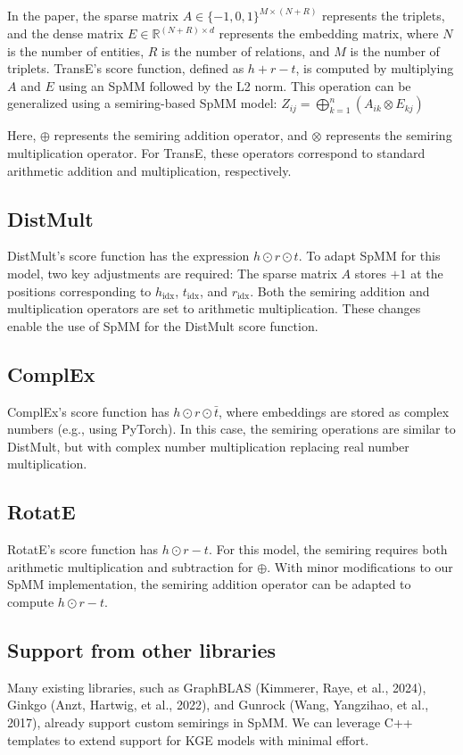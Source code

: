 In the paper, the sparse matrix $A \in \{-1,0,1\}^{M \times (N+R)}$ represents the triplets, and the dense matrix $E \in \mathbb{R}^{(N+R) \times d}$ represents the embedding matrix, where $N$ is the number of entities, $R$ is the number of relations, and $M$ is the number of triplets. TransE’s score function, defined as $h + r - t$, is computed by multiplying $A$ and $E$ using an SpMM followed by the L2 norm. This operation can be generalized using a semiring-based SpMM model: $Z_{ij} = \bigoplus_{k=1}^{n} (A_{ik} \otimes E_{kj})$

Here, $\oplus$ represents the semiring addition operator, and $\otimes$ represents the semiring multiplication operator. For TransE, these operators correspond to standard arithmetic addition and multiplication, respectively.

\subsection*{DistMult} 
DistMult’s score function has the expression $h \odot r \odot t$. To adapt SpMM for this model, two key adjustments are required: The sparse matrix $A$ stores $+1$ at the positions corresponding to $h_{\text{idx}}$, $t_{\text{idx}}$, and $r_{\text{idx}}$. Both the semiring addition and multiplication operators are set to arithmetic multiplication. These changes enable the use of SpMM for the DistMult score function.

\subsection*{ComplEx} 
ComplEx’s score function has $h \odot r \odot \bar{t}$, where embeddings are stored as complex numbers (e.g., using PyTorch). In this case, the semiring operations are similar to DistMult, but with complex number multiplication replacing real number multiplication.

\subsection*{RotatE} 
RotatE’s score function has $h \odot r - t$. For this model, the semiring requires both arithmetic multiplication and subtraction for $\oplus$. With minor modifications to our SpMM implementation, the semiring addition operator can be adapted to compute $h \odot r - t$.

\subsection*{Support from other libraries}
Many existing libraries, such as GraphBLAS (Kimmerer, Raye, et al., 2024), Ginkgo (Anzt, Hartwig, et al., 2022), and Gunrock (Wang, Yangzihao, et al., 2017), already support custom semirings in SpMM. We can leverage C++ templates to extend support for KGE models with minimal effort.


